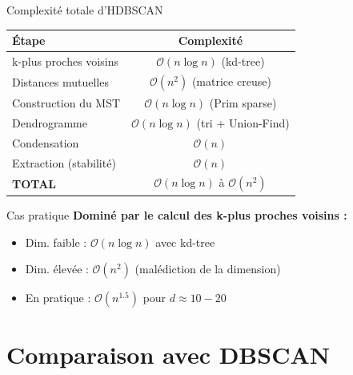 \documentclass[aspectratio=139,8pt]{beamer}
\begin{document}
\begin{frame}{Complexité totale d'HDBSCAN}
\begin{center}
\begin{tabular}{|l|c|}
\hline
\textbf{Étape} & \textbf{Complexité} \\
\hline
k-plus proches voisins & $\mathcal{O}(n \log n)$ (kd-tree) \\
\hline
Distances mutuelles & $\mathcal{O}(n^2)$ (matrice creuse) \\
\hline
Construction du MST & $\mathcal{O}(n \log n)$ (Prim sparse) \\
\hline
Dendrogramme & $\mathcal{O}(n \log n)$ (tri + Union-Find) \\
\hline
Condensation & $\mathcal{O}(n)$ \\
\hline
Extraction (stabilité) & $\mathcal{O}(n)$ \\
\hline
\textbf{TOTAL} & $\mathcal{O}(n \log n)$ à $\mathcal{O}(n^2)$ \\
\hline
\end{tabular}
\end{center}

\begin{alertblock}{Cas pratique}
\textbf{Dominé par le calcul des k-plus proches voisins :}
\begin{itemize}
\item Dim. faible : $\mathcal{O}(n \log n)$ avec kd-tree
\item Dim. élevée : $\mathcal{O}(n^2)$ (malédiction de la dimension)
\item En pratique : $\mathcal{O}(n^{1.5})$ pour $d \approx 10-20$
\end{itemize}
\end{alertblock}
\end{frame}

\section{Comparaison avec DBSCAN}
\end{document}
